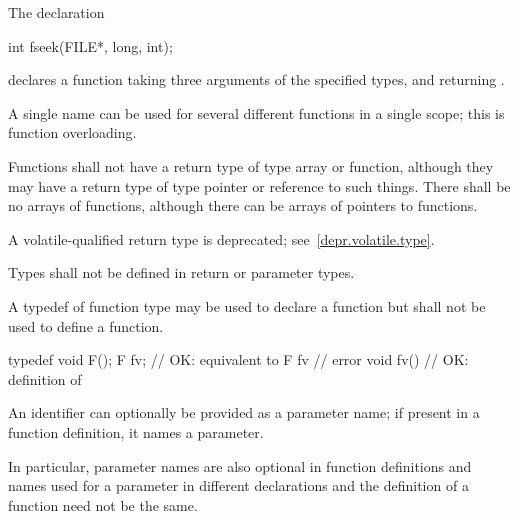 \pnum
\begin{example}
The declaration
\begin{codeblock}
int fseek(FILE*, long, int);
\end{codeblock}
declares a function taking three arguments of the specified types,
and returning
.
\end{example}

\pnum
{}%
\begin{note}
A single name can be used for several different functions in a single scope;
this is function overloading.
\end{note}

\pnum
{}%
%
Functions shall not have a return type of type array or function,
although they may have a return type of type pointer or reference to such things.
There shall be no arrays of functions, although there can be arrays of pointers
to functions.

\pnum
A volatile-qualified return type is deprecated;
see~\ref{depr.volatile.type}.

\pnum
Types shall not be defined in return or parameter types.

\pnum
{}%
A typedef of function type may be used to declare a function but shall not be
used to define a function.
\begin{example}
\begin{codeblock}
typedef void F();
F  fv;              // OK: equivalent to 
F  fv { }           // error
void fv() { }       // OK: definition of 
\end{codeblock}
\end{example}

\pnum
An identifier can optionally be provided as a parameter name;
if present in a function definition, it names a parameter.
\begin{note}
In particular, parameter names are also optional in function definitions
and names used for a parameter in different declarations and the definition
of a function need not be the same.
\end{note}

